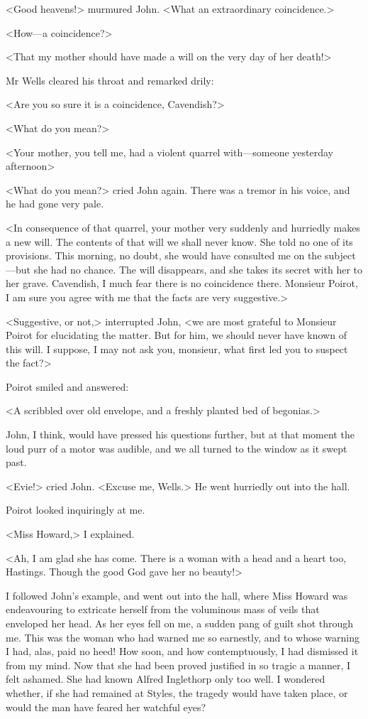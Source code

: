  <Good heavens!> murmured John. <What an extraordinary coincidence.> 

 <How—a coincidence?> 

 <That my mother should have made a will on the very day of her death!> 

 Mr Wells cleared his throat and remarked drily: 

 <Are you so sure it is a coincidence, Cavendish?> 

 <What do you mean?> 

 <Your mother, you tell me, had a violent quarrel with—someone yesterday afternoon\longdash> 

 <What do you mean?> cried John again. There was a tremor in his voice, and he had gone very pale. 

 <In consequence of that quarrel, your mother very suddenly and hurriedly makes a new will. The contents of that will we shall never know. She told no one of its provisions. This morning, no doubt, she would have consulted me on the subject—but she had no chance. The will disappears, and she takes its secret with her to her grave. Cavendish, I much fear there is no coincidence there. Monsieur Poirot, I am sure you agree with me that the facts are very suggestive.> 

 <Suggestive, or not,> interrupted John, <we are most grateful to Monsieur Poirot for elucidating the matter. But for him, we should never have known of this will. I suppose, I may not ask you, monsieur, what first led you to suspect the fact?> 

 Poirot smiled and answered: 

 <A scribbled over old envelope, and a freshly planted bed of begonias.> 

 John, I think, would have pressed his questions further, but at that moment the loud purr of a motor was audible, and we all turned to the window as it swept past. 

 <Evie!> cried John. <Excuse me, Wells.> He went hurriedly out into the hall. 

 Poirot looked inquiringly at me. 

 <Miss Howard,> I explained. 

 <Ah, I am glad she has come. There is a woman with a head and a heart too, Hastings. Though the good God gave her no beauty!> 

 I followed John's example, and went out into the hall, where Miss Howard was endeavouring to extricate herself from the voluminous mass of veils that enveloped her head. As her eyes fell on me, a sudden pang of guilt shot through me. This was the woman who had warned me so earnestly, and to whose warning I had, alas, paid no heed! How soon, and how contemptuously, I had dismissed it from my mind. Now that she had been proved justified in so tragic a manner, I felt ashamed. She had known Alfred Inglethorp only too well. I wondered whether, if she had remained at Styles, the tragedy would have taken place, or would the man have feared her watchful eyes? 

